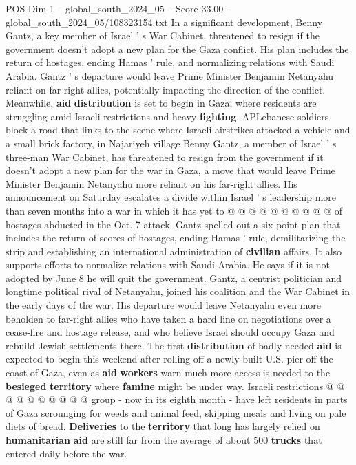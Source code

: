 \begin{textsample}{POS Dim 1 – global\_south\_2024\_05 – Score 33.00 – global\_south\_2024\_05/108323154.txt}  \label{ex:f1_pos_080}
In a significant development, Benny Gantz, a key member of Israel ' s War Cabinet, threatened to resign if the government doesn't adopt a new plan for the Gaza conflict.
His plan includes the return of hostages, ending Hamas ' rule, and normalizing relations with Saudi Arabia.
Gantz ' s departure would leave Prime Minister Benjamin Netanyahu reliant on far-right allies, potentially impacting the direction of the conflict.
Meanwhile, \textbf{aid} \textbf{distribution} is set to begin in Gaza, where residents are struggling amid Israeli restrictions and heavy \textbf{fighting}.
APLebanese soldiers block a road that links to the scene where Israeli airstrikes attacked a vehicle and a small brick factory, in Najariyeh village Benny Gantz, a member of Israel ' s three-man War Cabinet, has threatened to resign from the government if it doesn't adopt a new plan for the war in Gaza, a move that would leave Prime Minister Benjamin Netanyahu more reliant on his far-right allies.
His announcement on Saturday escalates a divide within Israel ' s leadership more than seven months into a war in which it has yet to @ @ @ @ @ @ @ @ @ @ of hostages abducted in the Oct. 7 attack.
Gantz spelled out a six-point plan that includes the return of scores of hostages, ending Hamas ' rule, demilitarizing the strip and establishing an international administration of \textbf{civilian} affairs.
It also supports efforts to normalize relations with Saudi Arabia.
He says if it is not adopted by June 8 he will quit the government.
Gantz, a centrist politician and longtime political rival of Netanyahu, joined his coalition and the War Cabinet in the early days of the war.
His departure would leave Netanyahu even more beholden to far-right allies who have taken a hard line on negotiations over a cease-fire and hostage release, and who believe Israel should occupy Gaza and rebuild Jewish settlements there.
The first \textbf{distribution} of badly needed \textbf{aid} is expected to begin this weekend after rolling off a newly built U.S. pier off the coast of Gaza, even as \textbf{aid} \textbf{workers} warn much more access is needed to the \textbf{besieged} \textbf{territory} where \textbf{famine} might be under way.
Israeli restrictions @ @ @ @ @ @ @ @ @ @ group - now in its eighth month - have left residents in parts of Gaza scrounging for weeds and animal feed, skipping meals and living on pale diets of bread. \textbf{Deliveries} to the \textbf{territory} that long has largely relied on \textbf{humanitarian} \textbf{aid} are still far from the average of about 500 \textbf{trucks} that entered daily before the war.

\end{textsample}
